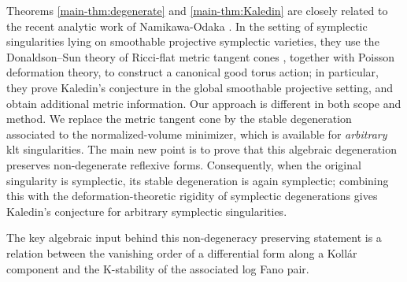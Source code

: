 \documentclass[12pt]{amsart}
\theoremstyle{definition}
\numberwithin{equation}{section}
\begin{document}

Theorems \ref{main-thm:degenerate} and \ref{main-thm:Kaledin} are closely related to the recent analytic work of Namikawa-Odaka \cite{NO-symp}. In the setting of symplectic singularities lying on smoothable projective symplectic varieties, they use the Donaldson–Sun theory of Ricci-flat metric tangent cones \cite{DS-degeneration2}, together with Poisson deformation theory, to construct a canonical good torus action; in particular, they prove Kaledin’s conjecture in the global smoothable projective setting, and obtain additional metric information. Our approach is different in both scope and method. We replace the metric tangent cone by the stable degeneration associated to the normalized-volume minimizer, which is available for \emph{arbitrary} klt singularities. The main new point is to prove that this algebraic degeneration preserves non-degenerate reflexive forms. Consequently, when the original singularity is symplectic, its stable degeneration is again symplectic; combining this with the deformation-theoretic rigidity of symplectic degenerations gives Kaledin’s conjecture for arbitrary symplectic singularities.

The key algebraic input behind this non-degeneracy preserving statement is a relation between the vanishing order of a differential form along a Kollár component and the K-stability of the associated log Fano pair. %
\end{document}
